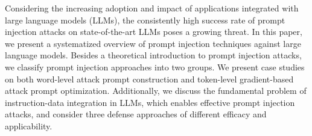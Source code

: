 Considering the increasing adoption and impact of applications integrated with large language models (LLMs), the consistently high success rate of prompt injection attacks on state-of-the-art LLMs poses a growing threat.
In this paper, we present a systematized overview of prompt injection techniques against large language models.
Besides a theoretical introduction to prompt injection attacks, we classify prompt injection approaches into two groups.
We present case studies on both word-level attack prompt construction and token-level gradient-based attack prompt optimization.
Additionally, we discuss the fundamental problem of instruction-data integration in LLMs, which enables effective prompt injection attacks, and consider three defense approaches of different efficacy and applicability.